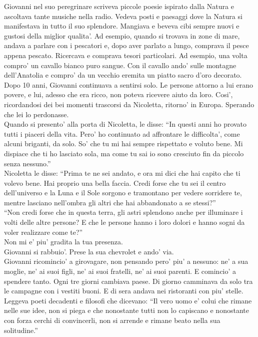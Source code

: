 Giovanni nel suo peregrinare scriveva piccole poesie ispirato dalla Natura e ascoltava tante musiche nella radio. Vedeva posti e paesaggi dove la Natura si manifestava in tutto il suo splendore. Mangiava e beveva cibi sempre nuovi e gustosi della miglior qualita'. Ad esempio, quando si trovava in zone di mare, andava a parlare con i pescatori e, dopo aver parlato a lungo, comprava il pesce appena pescato. Ricercava e comprava tesori particolari. Ad esempio, una volta compro' un cavallo bianco puro sangue. Con il cavallo ando' sulle montagne dell'Anatolia e compro' da un vecchio eremita un piatto sacro d'oro decorato.\\

Dopo 10 anni, Giovanni continuava a sentirsi solo. Le persone attorno a lui erano povere, e lui, adesso che era ricco, non poteva ricevere aiuto da loro. Cosi', ricordandosi dei bei momenti trascorsi da Nicoletta, ritorno' in Europa. Sperando che lei lo perdonasse.\\

Quando si presento' alla porta di Nicoletta, le disse: \enquote{In questi anni ho provato tutti i piaceri della vita. Pero' ho continuato ad affrontare le difficolta', come alcuni briganti, da solo. So' che tu mi hai sempre rispettato e voluto bene. Mi dispiace che ti ho lasciato sola, ma come tu sai io sono cresciuto fin da piccolo senza nessuno.}\\

Nicoletta le disse: \enquote{Prima te ne sei andato, e ora mi dici che hai capito che ti volevo bene. Hai proprio una bella faccia. Credi forse che tu sei il centro dell'universo e la Luna e il Sole sorgono e tramontano per vedere sorridere te, mentre lasciano nell'ombra gli altri che hai abbandonato a se stessi?} \\
\enquote{Non credi forse che in questa terra, gli astri splendono anche per illuminare i volti delle altre persone? E che le persone hanno i loro dolori e hanno sogni da voler realizzare come te?}\\
Non mi e' piu' gradita la tua presenza.\\

Giovanni si rabbuio'. Prese la sua chevrolet e ando' via.\\

Giovanni ricomincio' a girovagare, non pensando pero' piu' a nessuno: ne' a sua moglie, ne' ai suoi figli, ne' ai suoi fratelli, ne' ai suoi parenti. E comincio' a spendere tanto. Ogni tre giorni cambiava paese. Di giorno camminava da solo tra le campagne con i vestiti buoni. E di sera andava nei ristoranti con piu' stelle.\\
Leggeva poeti decadenti e filosofi che dicevano: \enquote{Il vero uomo e' colui che rimane nelle sue idee, non si piega e che nonostante tutti non lo capiscano e nonostante con forza cerchi di convincerli, non si arrende e rimane beato nella sua solitudine.}\\

